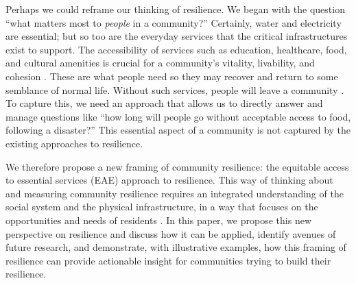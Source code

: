 \documentclass[onecolumn,doublespacing]{risa}
\let \cite \parencite
\begin{document}
Perhaps we could reframe our thinking of resilience.
We began with the question ``what matters most to \textit{people} in a community?''
Certainly, water and electricity are essential; but so too are the everyday services that the critical infrastructures exist to support.
The accessibility of services such as education, healthcare, food, and cultural amenities is crucial for a community's vitality, livability, and cohesion \cite{Dempsey2011-og, Talen2003-dc, Winter1997-kc, United_Nations_Educational_Scientific_and_Cultural_Organization2018-sf, Contreras2017-yq}.  
These are what people need so they may recover and return to some semblance of normal life. 
Without such services, people will leave a community \cite{Contreras2017-yq}.
To capture this, we need an approach that allows us to directly answer and manage questions like ``how long will people go without acceptable access to food, following a disaster?''
This essential aspect of a community is not captured by the existing approaches to resilience.

We therefore propose a new framing of community resilience: the equitable access to essential services (EAE) approach to resilience.
This way of thinking about and measuring community resilience requires an integrated understanding of the social system and the physical infrastructure, in a way that focuses on the opportunities and needs of residents \cite{Koliou2018-jt, Cutter2016-landscape}.
In this paper, we propose this new perspective on resilience and discuss how it can be applied, identify avenues of future research, and demonstrate, with illustrative examples, how this framing of resilience can provide actionable insight for communities trying to build their resilience.
\end{document}
